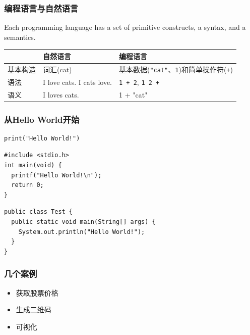 \documentclass[aspectratio=169, 14pt]{beamer}
\begin{document}
\begin{frame}
	\frametitle{编程语言与自然语言}
	Each programming language has a set of primitive constructs, a syntax, and a semantics.

	\begin{tabular}{l l p{2in}}
		\toprule
		     & \textbf{自然语言}                     & \textbf{编程语言}                                       \\
		\midrule
		基本构造 & 词汇(cat)                           & 基本数据(\texttt{"cat"}、\texttt{1})和简单操作符({\texttt{+}}) \\
		语法   & I love cats. \alert{I cats love}. & \texttt{1 + 2}, \alert{\texttt{1 2 +}}              \\
		语义   & \alert{I loves cats}.             & \alert{1 + "cat"}                                   \\
		\bottomrule
	\end{tabular}

\end{frame}

\begin{frame}[fragile]
	\frametitle{从Hello World开始}
	\begin{verbatim}
print("Hello World!")
  \end{verbatim}

	\begin{verbatim}
#include <stdio.h>
int main(void) {
  printf("Hello World!\n");
  return 0;
}
  \end{verbatim}

	\begin{verbatim}
public class Test {
  public static void main(String[] args) {
    System.out.println("Hello World!");
  }
}
  \end{verbatim}

\end{frame}

\begin{frame}
	\frametitle{几个案例}
	\begin{itemize}
		\item 获取股票价格
		\item 生成二维码
		\item 可视化
	\end{itemize}
\end{frame}
\end{document}
